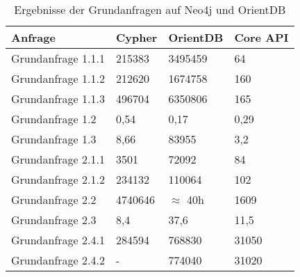 \begin{table}[h]
	\centering
	\begin{tabular}{ |p{6cm}||p{2cm}|p{2cm}|p{2cm}|  }
		\hline
		Anfrage& Cypher & OrientDB & Core API \\
		\hline
	Grundanfrage 1.1.1  & 215383 & 3495459    &  64\\
	Grundanfrage 1.1.2& 212620 & 1674758   & 160   \\
	Grundanfrage 1.1.3& 496704 & 6350806 & 165  \\
	Grundanfrage 1.2& 0,54 & 0,17   & 0,29   \\
	Grundanfrage 1.3 & 8,66& 83955  & 3,2    \\
	Grundanfrage 2.1.1& 3501 & 72092   & 84   \\
	Grundanfrage 2.1.2& 234132& 110064  & 102    \\
	Grundanfrage 2.2& 4740646 &  $\approx$ 40h   & 1609  \\
	Grundanfrage 2.3& 8,4  & 37,6   & 11,5   \\
	Grundanfrage 2.4.1& 284594 & 768830  & 31050\\
	Grundanfrage 2.4.2& -  & 774040   & 31020   \\
		\hline
	\end{tabular}
	\caption{Ergebnisse der Grundanfragen auf Neo4j und OrientDB}
	\label{tab:Query3}
\end{table}
\FloatBarrier
